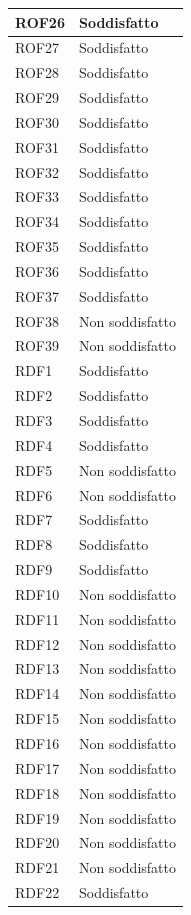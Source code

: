 \begin{longtable}{| p{2.5cm} | p{3cm} |}
	ROF26 & Soddisfatto \\ \hline
	ROF27 & Soddisfatto \\ \hline
	ROF28 & Soddisfatto \\ \hline
	ROF29 & Soddisfatto \\ \hline
	ROF30 & Soddisfatto \\ \hline
	ROF31 & Soddisfatto \\ \hline
	ROF32 & Soddisfatto \\ \hline
	ROF33 & Soddisfatto \\ \hline
	ROF34 & Soddisfatto \\ \hline
	ROF35 & Soddisfatto \\ \hline
	ROF36 & Soddisfatto \\ \hline
	ROF37 & Soddisfatto \\ \hline
	ROF38 & Non soddisfatto \\ \hline
	ROF39 & Non soddisfatto \\ \hline
	RDF1 & Soddisfatto \\ \hline
	RDF2 & Soddisfatto \\ \hline
	RDF3 & Soddisfatto \\ \hline
	RDF4 & Soddisfatto \\ \hline
	RDF5 & Non soddisfatto \\ \hline
	RDF6 & Non soddisfatto \\ \hline
	RDF7 & Soddisfatto \\ \hline
	RDF8 & Soddisfatto \\ \hline
	RDF9 & Soddisfatto \\ \hline
	RDF10 & Non soddisfatto \\ \hline
	RDF11 & Non soddisfatto \\ \hline
	RDF12 & Non soddisfatto \\ \hline
	RDF13 & Non soddisfatto \\ \hline
	RDF14 & Non soddisfatto \\ \hline
	RDF15 & Non soddisfatto \\ \hline
	RDF16 & Non soddisfatto \\ \hline
	RDF17 & Non soddisfatto \\ \hline
	RDF18 & Non soddisfatto \\ \hline
	RDF19 & Non soddisfatto \\ \hline
	RDF20 & Non soddisfatto \\ \hline
	RDF21 & Non soddisfatto \\ \hline
	RDF22 & Soddisfatto \\ \hline

\end{longtable}
